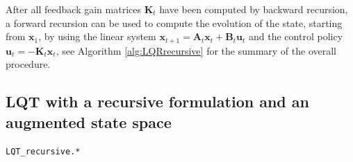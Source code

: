 \documentclass[10pt,a4paper]{article} %
\newcommand{\filename}[1]{\colorbox{rr2}{\color{white}\texttt{#1}}}
\begin{document}
After all feedback gain matrices $\bm{K}_t$ have been computed by backward recursion, a forward recursion can be used to compute the evolution of the state, starting from $\bm{x}_1$, by using the linear system $\bm{x}_{t+1}=\bm{A}_t\bm{x}_t+\bm{B}_t\bm{u}_t$ and the control policy $\bm{u}_t = -\bm{K}_t \bm{x}_t$, see Algorithm \ref{alg:LQRrecursive} for the summary of the overall procedure.


\subsection{LQT with a recursive formulation and an augmented state space}\label{sec:augmState}
\begin{flushright}
\filename{LQT\_recursive.*}
\end{flushright}
\end{document}

